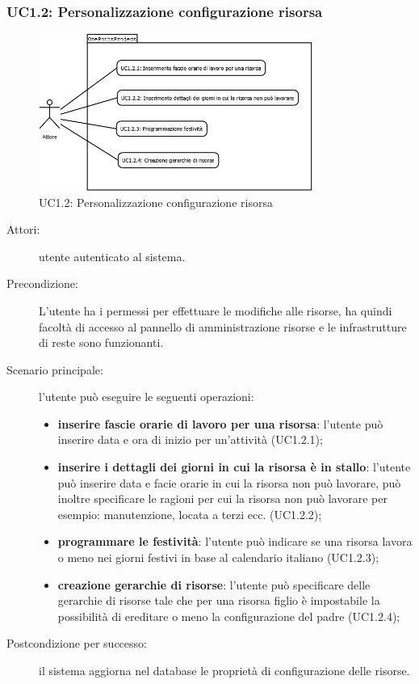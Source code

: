 \subsubsection[UC1.2: Personalizzazione configurazione risorsa]{UC1.2: Personalizzazione configurazione risorsa}
\begin{figure}[H]
\begin{center}
\includegraphics[width=0.80\textwidth]{img/UC/UC1.2.png}
\caption{UC1.2: Personalizzazione configurazione risorsa}
\label{fig:UC1.2}
\end{center}
\end{figure}

\begin{description}
\item[Attori:]{utente autenticato al sistema.}
\item[Precondizione:]{L\textquoteright{}utente ha i permessi per effettuare le modifiche alle risorse, ha quindi facolt\`{a} di accesso al pannello di amministrazione risorse e le infrastrutture di reste sono funzionanti.}
\item[Scenario principale:]{l\textquoteright{}utente pu\`{o} eseguire le seguenti operazioni:
	\begin{itemize}
	\item \textbf{inserire fascie orarie di lavoro per una risorsa}: l\textquoteright{}utente pu\`{o} inserire data e ora di inizio per un\textquoteright{}attivit\`{a} (UC1.2.1);
	\item \textbf{inserire i dettagli dei giorni in cui la risorsa \`{e} in stallo}: l\textquoteright{}utente pu\`{o} inserire data e facie orarie in cui la risorsa non pu\`{o} lavorare, pu\`{o} inoltre specificare le ragioni per cui la risorsa non pu\`{o} lavorare per esempio: manutenzione, locata a terzi ecc. (UC1.2.2);
	\item \textbf{programmare le festivit\`{a}}: l\textquoteright{}utente pu\`{o} indicare se una risorsa lavora o meno nei giorni festivi in base al calendario italiano (UC1.2.3);
	\item \textbf{creazione gerarchie di risorse}: l\textquoteright{}utente pu\`{o} specificare delle gerarchie di risorse tale che per una risorsa figlio \`{e} impostabile la possibilit\`{a} di ereditare o meno la configurazione del padre (UC1.2.4);
	\end{itemize}}
\item[Postcondizione per successo:]{il sistema aggiorna nel database le propriet\`{a} di configurazione delle risorse.}
\end{description}
